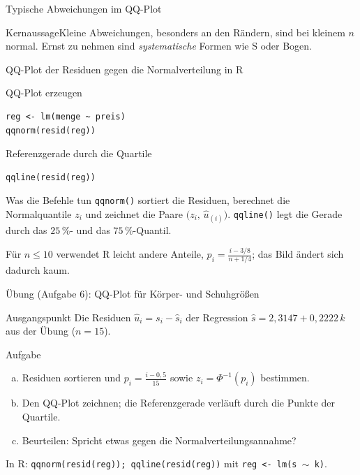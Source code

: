 \documentclass[aspectratio=169,11pt]{beamer}
\newcommand{\kernaussage}[1]{\begin{alertblock}{Kernaussage}#1\end{alertblock}}
\begin{document}
\begin{frame}{Typische Abweichungen im QQ-Plot}
  \kernaussage{Kleine Abweichungen, besonders an den Rändern, sind bei kleinem $n$
    normal. Ernst zu nehmen sind \emph{systematische} Formen wie S oder Bogen.}
\end{frame}

\begin{frame}[fragile]{QQ-Plot der Residuen gegen die Normalverteilung in R}
  \begin{block}{QQ-Plot erzeugen}
\begin{lstlisting}
reg <- lm(menge ~ preis)
qqnorm(resid(reg))
\end{lstlisting}
  \end{block}

  \begin{block}{Referenzgerade durch die Quartile}
\begin{lstlisting}
qqline(resid(reg))
\end{lstlisting}
  \end{block}

  \begin{exampleblock}{Was die Befehle tun}
    \texttt{qqnorm()} sortiert die Residuen, berechnet die Normalquantile
    $z_i$ und zeichnet die Paare $\bigl(z_i,\,\hat{u}_{(i)}\bigr)$.
    \texttt{qqline()} legt die Gerade durch das $25\,\%$- und das
    $75\,\%$-Quantil.
  \end{exampleblock}
  \footnotesize Für $n \le 10$ verwendet R leicht andere Anteile,
  $p_i = \frac{i - 3/8}{n + 1/4}$; das Bild ändert sich dadurch kaum.
\end{frame}

\begin{frame}{Übung (Aufgabe 6): QQ-Plot für Körper- und Schuhgrößen}
  \begin{block}{Ausgangspunkt}
    Die Residuen $\hat{u}_i = s_i - \hat{s}_i$ der Regression
    $\hat{s} = 2{,}3147 + 0{,}2222\,k$ aus der Übung ($n = 15$).
  \end{block}

  \begin{exampleblock}{Aufgabe}
    \begin{enumerate}[a)]
      \item Residuen sortieren und $p_i = \frac{i - 0{,}5}{15}$ sowie
            $z_i = \Phi^{-1}(p_i)$ bestimmen.
      \item Den QQ-Plot zeichnen; die Referenzgerade verläuft durch die
            Punkte der Quartile.
      \item Beurteilen: Spricht etwas gegen die Normalverteilungsannahme?
    \end{enumerate}
  \end{exampleblock}

  \footnotesize In R: \texttt{qqnorm(resid(reg)); qqline(resid(reg))} mit
  \texttt{reg <- lm(s $\sim$ k)}.
\end{frame}
\end{document}
